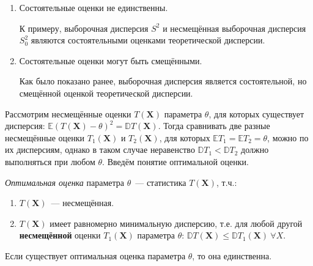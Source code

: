 \begin{rmrk}
\begin{enumerate}
    \item Состоятельные оценки не единственны.
    
    К примеру, выборочная дисперсия $S^{2}$ и несмещённая выборочная дисперсия $S_0^{2}$ являются состоятельными оценками теоретической дисперсии.
    
    \item Состоятельные оценки могут быть смещёнными.
    
    Как было показано ранее, выборочная дисперсия является состоятельной, но смещённой оценкой теоретической дисперсии.
    
    \end{enumerate}
\end{rmrk}

Рассмотрим несмещённые оценки $T(\mathbf{X})$ параметра $\theta$, для которых существует дисперсия: $\mathbb{E}(T(\mathbf{X})-\theta)^{2}=\mathbb{D} T(\mathbf{X})$. Тогда сравнивать две разные несмещённые оценки $T_{1}(\mathbf{X})$ и $T_{2}(\mathbf{X})$, для которых $\mathbb{E}T_{1} = \mathbb{E}T_{2} = \theta$, можно по их дисперсиям, однако в таком случае неравенство $\mathbb{D} T_{1}<\mathbb{D} T_{2}$ должно выполняться при любом $\theta$. Введём понятие оптимальной оценки.
\begin{defn}
{\it Оптимальная оценка} параметра $\theta$~--- статистика $T(\mathbf{X})$, т.ч.:
\begin{enumerate}
    \item $T(\mathbf{X})$~--- несмещённая.
    \item $T(\mathbf{X})$ имеет равномерно минимальную дисперсию, т.е. для любой другой \textbf{несмещённой} оценки $T_{1}(\mathbf{X})$ параметра $\theta$: $\mathbb{D} T(\mathbf{X}) \leqslant \mathbb{D} T_{1}(\mathbf{X})~ \forall X$.
\end{enumerate}
\end{defn}

\begin{thm*}
Если существует оптимальная оценка параметра $\theta$, то она единственна.
\end{thm*}

